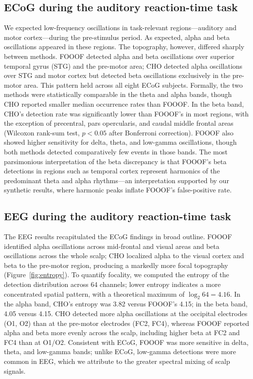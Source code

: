 \documentclass[11pt]{article}
\begin{document}
\subsection{ECoG during the auditory reaction-time task}

We expected low-frequency oscillations in task-relevant regions---auditory and motor cortex---during the pre-stimulus period. As expected, alpha and beta oscillations appeared in these regions. The topography, however, differed sharply between methods. FOOOF detected alpha and beta oscillations over superior temporal gyrus (STG) and the pre-motor area; CHO detected alpha oscillations over STG and motor cortex but detected beta oscillations exclusively in the pre-motor area. This pattern held across all eight ECoG subjects. Formally, the two methods were statistically comparable in the theta and alpha bands, though CHO reported smaller median occurrence rates than FOOOF. In the beta band, CHO's detection rate was significantly lower than FOOOF's in most regions, with the exception of precentral, pars opercularis, and caudal middle frontal areas (Wilcoxon rank-sum test, $p < 0.05$ after Bonferroni correction). FOOOF also showed higher sensitivity for delta, theta, and low-gamma oscillations, though both methods detected comparatively few events in those bands. The most parsimonious interpretation of the beta discrepancy is that FOOOF's beta detections in regions such as temporal cortex represent harmonics of the predominant theta and alpha rhythms---an interpretation supported by our synthetic results, where harmonic peaks inflate FOOOF's false-positive rate.

\subsection{EEG during the auditory reaction-time task}

The EEG results recapitulated the ECoG findings in broad outline. FOOOF identified alpha oscillations across mid-frontal and visual areas and beta oscillations across the whole scalp; CHO localized alpha to the visual cortex and beta to the pre-motor region, producing a markedly more focal topography (Figure~\ref{fig:entropy}). To quantify focality, we computed the entropy of the detection distribution across 64 channels; lower entropy indicates a more concentrated spatial pattern, with a theoretical maximum of $\log_2 64 = 4.16$. In the alpha band, CHO's entropy was 3.82 versus FOOOF's 4.15; in the beta band, 4.05 versus 4.15. CHO detected more alpha oscillations at the occipital electrodes (O1, O2) than at the pre-motor electrodes (FC2, FC4), whereas FOOOF reported alpha and beta more evenly across the scalp, including higher beta at FC2 and FC4 than at O1/O2. Consistent with ECoG, FOOOF was more sensitive in delta, theta, and low-gamma bands; unlike ECoG, low-gamma detections were more common in EEG, which we attribute to the greater spectral mixing of scalp signals.
\end{document}
